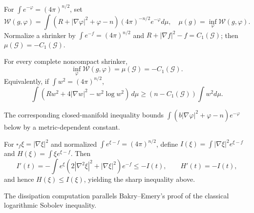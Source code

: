 \begin{definition}
\label{def:chow-iv-shrinker-entropy}
For $\int e^{-\varphi}=(4\pi)^{n/2}$, set
\[
\mathcal W(g,\varphi)=\int(R+|\nabla\varphi|^2+\varphi-n)(4\pi)^{-n/2}e^{-\varphi}d\mu,
\quad \mu(g)=\inf_\varphi\mathcal W(g,\varphi).
\]
Normalize a shrinker by $\int e^{-f}=(4\pi)^{n/2}$ and
$R+|\nabla f|^2-f=C_1(\mathcal G)$; then $\mu(\mathcal G)=-C_1(\mathcal G)$.
\end{definition}

\begin{theorem}
\label{thm:chow-iv-sharp-log-sobolev}
For every complete noncompact shrinker,
\[
\inf_\varphi\mathcal W(g,\varphi)=\mu(\mathcal G)=-C_1(\mathcal G).
\]
Equivalently, if $\int w^2=(4\pi)^{n/2}$,
\[
\int(Rw^2+4|\nabla w|^2-w^2\log w^2)\,d\mu
\ge(n-C_1(\mathcal G))\int w^2d\mu.
\]
\end{theorem}

\begin{remark}
\label{rem:chow-iv-log-sobolev-closed}
The corresponding closed-manifold inequality bounds
$\int(b|\nabla\varphi|^2+\varphi-n)e^{-\varphi}$ below by a metric-dependent constant.
\end{remark}

\begin{lemma}
\label{lem:chow-iv-fisher-entropy-dissipation}
For $\square_f\xi=|\nabla\xi|^2$ and normalized
$\int e^{\xi-f}=(4\pi)^{n/2}$, define
$I(\xi)=\int|\nabla\xi|^2e^{\xi-f}$ and
$H(\xi)=\int\xi e^{\xi-f}$.  Then
\[
I'(t)=-\int e^{\xi}(2|\nabla^2\xi|^2+|\nabla\xi|^2)e^{-f}\le-I(t),
\qquad H'(t)=-I(t),
\]
and hence $H(\xi)\le I(\xi)$, yielding the sharp inequality above.
\end{lemma}

\begin{remark}
\label{rem:chow-iv-bakry-emery-method}
The dissipation computation parallels Bakry--Emery's proof of the classical
logarithmic Sobolev inequality.
\end{remark}

